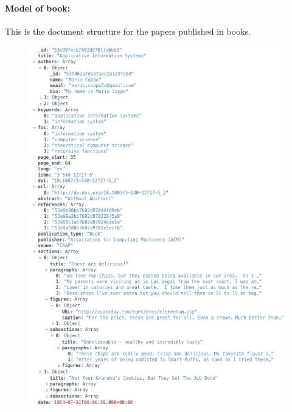 \paragraph{Model of book:}
This is the document structure for the papers published in books.
\begin{figure}[H]
    \begin{center}
        \includegraphics[width=0.9\linewidth]{ImagesMongoDB/book}
        \label{fig:book}%
    \end{center}
\end{figure}

